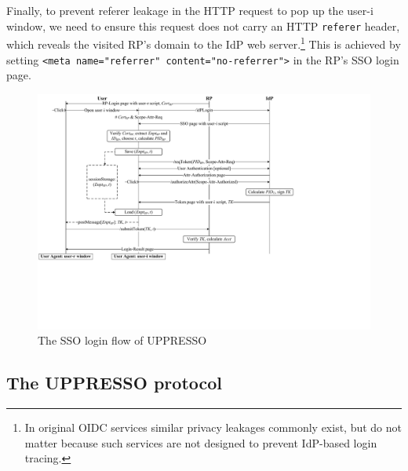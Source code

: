 Finally, to prevent referer leakage in the HTTP request to pop up the user-i window,
 we need to ensure this request does not carry an HTTP \texttt{referer} header, which reveals the visited RP's domain to the IdP web server.\footnote{In original OIDC services similar privacy leakages commonly exist, but do not matter because such services are not designed to prevent IdP-based login tracing.} %
%
This is achieved by setting
\verb+<meta name="referrer" content="no-referrer">+
in the RP's SSO login page.

\begin{figure}[htb]
  \centering
  \includegraphics[width=0.825\linewidth]{fig/pop-up-process.pdf}
  \caption{The SSO login flow of UPPRESSO}
  \label{fig:process}
\end{figure}



\subsection{The UPPRESSO protocol}
\label{implementations}

